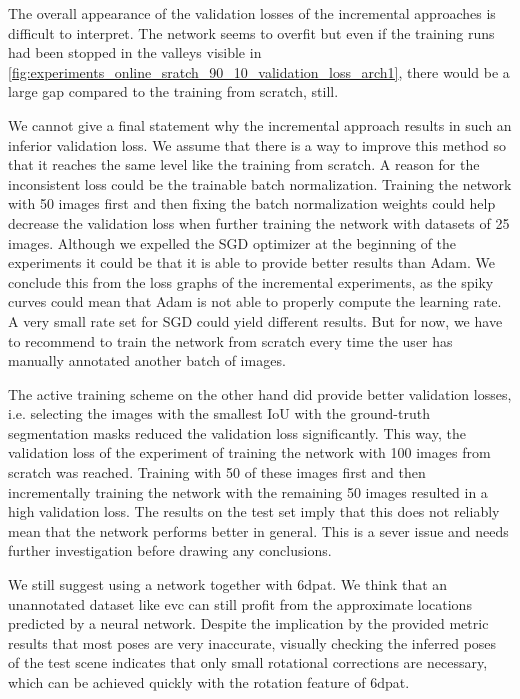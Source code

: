 The overall appearance of the validation losses of the incremental approaches is difficult to interpret. The network seems to overfit but even if the training runs had been stopped in the valleys visible in \fig \ref{fig:experiments_online_sratch_90_10_validation_loss_arch1}, there would be a large gap compared to the training from scratch, still.

We cannot give a final statement why the incremental approach results in such an inferior validation loss. We assume that there is a way to improve this method so that it reaches the same level like the training from scratch. A reason for the inconsistent loss could be the trainable batch normalization. Training the network with 50 images first and then fixing the batch normalization weights could help decrease the validation loss when further training the network with datasets of 25 images. Although we expelled the SGD optimizer at the beginning of the experiments it could be that it is able to provide better results than Adam. We conclude this from the loss graphs of the incremental experiments, as the spiky curves could mean that Adam is not able to properly compute the learning rate. A very small rate set for SGD could yield different results. But for now, we have to recommend to train the network from scratch every time the user has manually annotated another batch of images.

The active training scheme on the other hand did provide better validation losses, i.e. selecting the images with the smallest IoU with the ground-truth segmentation masks reduced the validation loss significantly. This way, the validation loss of the experiment of training the network with 100 images from scratch was reached. Training with 50 of these images first and then incrementally training the network with the remaining 50 images resulted in a high validation loss. The results on the test set imply that this does not reliably mean that the network performs better in general. This is a sever issue and needs further investigation before drawing any conclusions.

We still suggest using a network together with \ac{6dpat}. We think that an unannotated dataset like \ac{evc} can still profit from the approximate locations predicted by a neural network. Despite the implication by the provided metric results that most poses are very inaccurate, visually checking the inferred poses of the test scene indicates that only small rotational corrections are necessary, which can be achieved quickly with the rotation feature of \ac{6dpat}.
